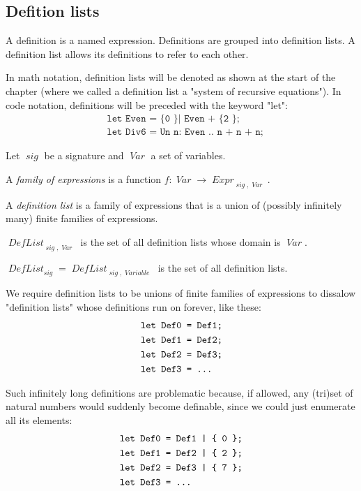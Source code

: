 \documentclass[oneside,12pt]{book}
\theoremstyle{definition}
\theoremstyle{remark}
\newcommand\var[1]{\mathop{\mathit{#1}}\nolimits}
\newcommand{\sig}{\var{sig}}
\newcommand{\Var}{\var{Var}}
\newcommand{\Variable}{\var{Variable}}
\newcommand{\Expr}{\var{Expr}}
\newcommand{\DefList}{\var{DefList}}
\begin{document}
\subsection{Defition lists}

A definition is a named expression. Definitions are grouped into definition
lists. A definition list allows its definitions to refer to each other.

In math notation, definition lists will be denoted as shown at the start of the
chapter (where we called a definition list a "system of recursive equations").
In code notation, definitions will be preceded with the keyword "let":
\begin{align*}
  &\texttt{let Even = \{ 0 \} | Even + \{ 2 \};} \\
  &\texttt{let Div6 = Un n: Even .. n + n + n;}
\end{align*}

\begin{defBox}
  Let $\sig$ be a signature and $\Var$ a set of variables.
  
  \medskip \noindent A \textit{family of expressions} is a function
  $f\colon \Var \to \Expr_{\sig,\Var}$.
  
  \medskip \noindent A \textit{definition list} is a family of expressions that
  is a union of (possibly infinitely many) finite families of expressions.

  \medskip \noindent $\DefList_{\sig,\Var}$ is the set of all definition lists
  whose domain is $\Var$.
  
  \nopagebreak \medskip \noindent $\DefList_{\sig} = \DefList_{\sig,\Variable}$
  is the set of all definition lists.
\end{defBox}

We require definition lists to be unions of finite families of expressions
to dissalow "definition lists" whose definitions run on forever, like these:
\begin{gather*}
  \texttt{let Def0 = Def1;} \\
  \texttt{let Def1 = Def2;} \\
  \texttt{let Def2 = Def3;} \\
  \texttt{let Def3 = ...\phantom{3;}}
\end{gather*}

Such infinitely long definitions are problematic because, if allowed,
any (tri)set of natural numbers would suddenly become definable, since
we could just enumerate all its elements:
\begin{gather*}
  \texttt{let Def0 = Def1 | \{ 0 \};} \\
  \texttt{let Def1 = Def2 | \{ 2 \};} \\
  \texttt{let Def2 = Def3 | \{ 7 \};} \\
  \texttt{let Def3 = ...\phantom{4 | \{ 9 \};}}
\end{gather*}
\end{document}
